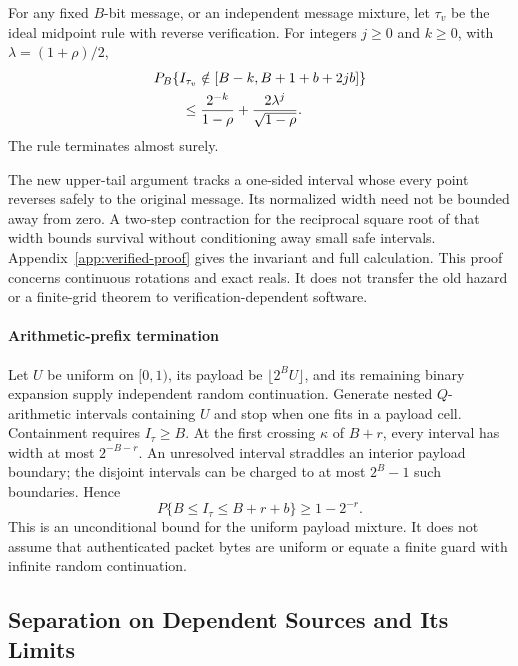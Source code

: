 \begin{lemma}
\label{lem:verified-band}
For any fixed $B$-bit message, or an independent message mixture, let $\tau_v$
be the ideal midpoint rule with reverse verification. For integers $j\ge0$
and $k\ge0$, with $\lambda=(1+\rho)/2$,
\begin{align}
 &P_B\{I_{\tau_v}\notin[B-k,B+1+b+2jb]\}\notag\\
 &\qquad\le\frac{2^{-k}}{1-\rho}
       +\frac{2\lambda^j}{\sqrt{1-\rho}}.
 \label{eq:verified-band}
\end{align}
The rule terminates almost surely.
\end{lemma}

The new upper-tail argument tracks a one-sided interval whose every point
reverses safely to the original message. Its normalized width need not be
bounded away from zero. A two-step contraction for the reciprocal square root
of that width bounds survival without conditioning away small safe intervals.
Appendix~\ref{app:verified-proof} gives the invariant and full calculation.
This proof concerns continuous rotations and exact reals. It does not transfer
the old hazard or a finite-grid theorem to verification-dependent software.

\paragraph{Arithmetic-prefix termination}
Let $U$ be uniform on $[0,1)$, its payload be $\lfloor2^B U\rfloor$, and its
remaining binary expansion supply independent random continuation. Generate
nested $Q$-arithmetic intervals containing $U$ and stop when one fits in a
payload cell. Containment requires $I_\tau\ge B$. At the first crossing
$\kappa$ of $B+r$, every interval has width at most $2^{-B-r}$. An unresolved
interval straddles an interior payload boundary; the disjoint intervals can
be charged to at most $2^B-1$ such boundaries. Hence
\begin{equation}
 P\{B\le I_\tau\le B+r+b\}\ge1-2^{-r}.
 \label{eq:prefix-band}
\end{equation}
This is an unconditional bound for the uniform payload mixture. It does not
assume that authenticated packet bytes are uniform or equate a finite guard
with infinite random continuation.

\subsection{Separation on Dependent Sources and Its Limits}


